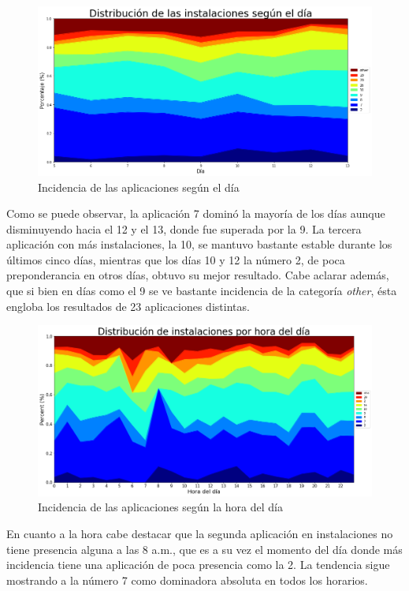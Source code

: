\documentclass[a4paper, 12pt]{article}
\begin{document}
		\FloatBarrier
		\begin{figure}[h]
			\centering
			\includegraphics[width= \textwidth]{images/installs/appsxdiaarea.png}
			\caption{Incidencia de las aplicaciones según el día}
		\end{figure}
		\FloatBarrier

		Como se puede observar, la aplicación 7 dominó la mayoría de los días aunque disminuyendo hacia el 12 y el 13, donde fue superada por la 9. La tercera aplicación con más instalaciones, la 10, se mantuvo bastante estable durante los últimos cinco días, mientras que los días 10 y 12 la número 2, de poca preponderancia en otros días, obtuvo su mejor resultado. Cabe aclarar además, que si bien en días como el 9 se ve bastante incidencia de la categoría \textit{other}, ésta engloba los resultados de 23 aplicaciones distintas.

		\FloatBarrier
		\begin{figure}[h]
			\centering
			\includegraphics[width=\textwidth]{images/installs/appsxhora.png}
			\caption{Incidencia de las aplicaciones según la hora del día}
		\end{figure}
		\FloatBarrier

		En cuanto a la hora cabe destacar que la segunda aplicación en instalaciones no tiene presencia alguna a las 8 a.m., que es a su vez el momento del día donde más incidencia tiene una aplicación de poca presencia como la 2. La tendencia sigue mostrando a la número 7 como dominadora absoluta en todos los horarios.
\end{document}

